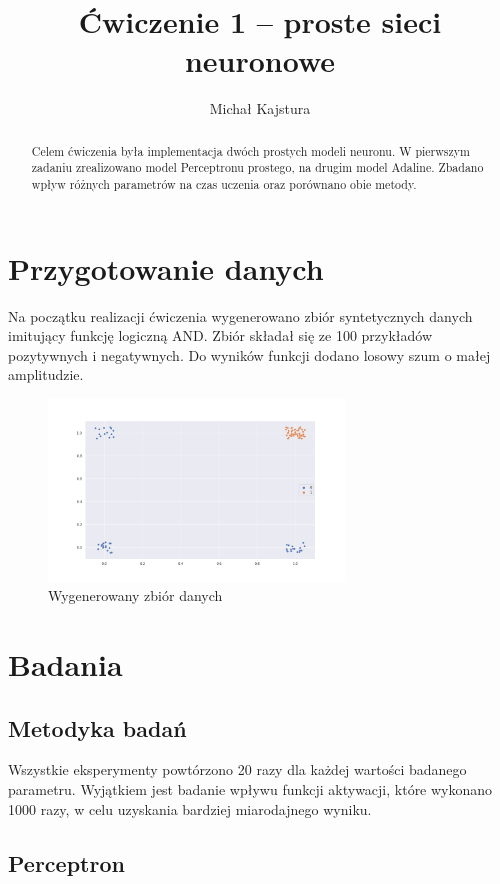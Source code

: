 \documentclass{article}
\title{Ćwiczenie 1 – proste sieci neuronowe}
\author{Michał Kajstura}
\begin{document}
\maketitle

\begin{abstract}
 Celem ćwiczenia była implementacja dwóch prostych modeli neuronu.
 W pierwszym zadaniu zrealizowano model Perceptronu prostego, na drugim 
 model Adaline. Zbadano wpływ różnych parametrów na czas uczenia oraz porównano
 obie metody. 
\end{abstract}

\section{Przygotowanie danych}
Na początku realizacji ćwiczenia wygenerowano zbiór syntetycznych danych 
imitujący funkcję logiczną AND.
Zbiór składał się ze 100 przykładów pozytywnych i negatywnych.
Do wyników funkcji dodano losowy szum o małej amplitudzie.

\begin{figure}[h]
  \caption{Wygenerowany zbiór danych}
  \centering
    \includegraphics[width=0.7\textwidth]{images/01_data.png}
\end{figure}

\section{Badania}

\subsection{Metodyka badań}
Wszystkie eksperymenty powtórzono 20 razy dla każdej wartości badanego parametru.
Wyjątkiem jest badanie wpływu funkcji aktywacji, które wykonano 1000 razy, w celu
uzyskania bardziej miarodajnego wyniku. 

\subsection{Perceptron}
\label{headings}
\end{document}
